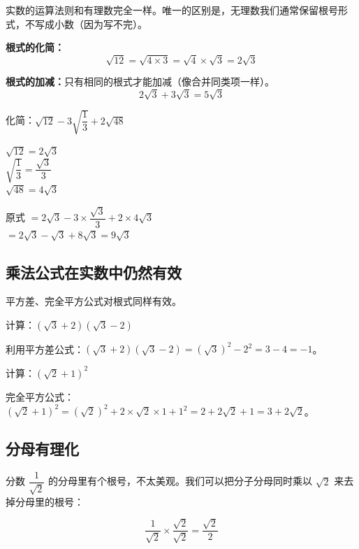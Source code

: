 实数的运算法则和有理数完全一样。唯一的区别是，无理数我们通常保留根号形式，不写成小数（因为写不完）。

\textbf{根式的化简：}
\[
\sqrt{12} = \sqrt{4\times3} = \sqrt{4}\times\sqrt{3} = 2\sqrt{3}
\]

\textbf{根式的加减：}只有相同的根式才能加减（像合并同类项一样）。
\[
2\sqrt{3} + 3\sqrt{3} = 5\sqrt{3}
\]

\begin{example}
化简：$\sqrt{12}-3\sqrt{\dfrac{1}{3}}+2\sqrt{48}$
\end{example}
\begin{solution}
$\sqrt{12} = 2\sqrt{3}$\\
$\sqrt{\dfrac{1}{3}} = \dfrac{\sqrt{3}}{3}$\\
$\sqrt{48} = 4\sqrt{3}$

原式 $= 2\sqrt{3} - 3\times\dfrac{\sqrt{3}}{3} + 2\times4\sqrt{3}$\\
$= 2\sqrt{3} - \sqrt{3} + 8\sqrt{3} = 9\sqrt{3}$
\end{solution}

\subsection*{乘法公式在实数中仍然有效}

平方差、完全平方公式对根式同样有效。

\begin{example}
计算：$(\sqrt{3}+2)(\sqrt{3}-2)$
\end{example}
\begin{solution}
利用平方差公式：$(\sqrt{3}+2)(\sqrt{3}-2) = (\sqrt{3})^2-2^2 = 3-4 = -1$。
\end{solution}

\begin{example}
计算：$(\sqrt{2}+1)^2$
\end{example}
\begin{solution}
完全平方公式：$(\sqrt{2}+1)^2 = (\sqrt{2})^2+2\times\sqrt{2}\times1+1^2 = 2+2\sqrt{2}+1 = 3+2\sqrt{2}$。
\end{solution}

\subsection*{分母有理化}

分数 $\dfrac{1}{\sqrt{2}}$ 的分母里有个根号，不太美观。我们可以把分子分母同时乘以 $\sqrt{2}$ 来去掉分母里的根号：

\[
\frac{1}{\sqrt{2}} \times \frac{\sqrt{2}}{\sqrt{2}} = \frac{\sqrt{2}}{2}
\]

